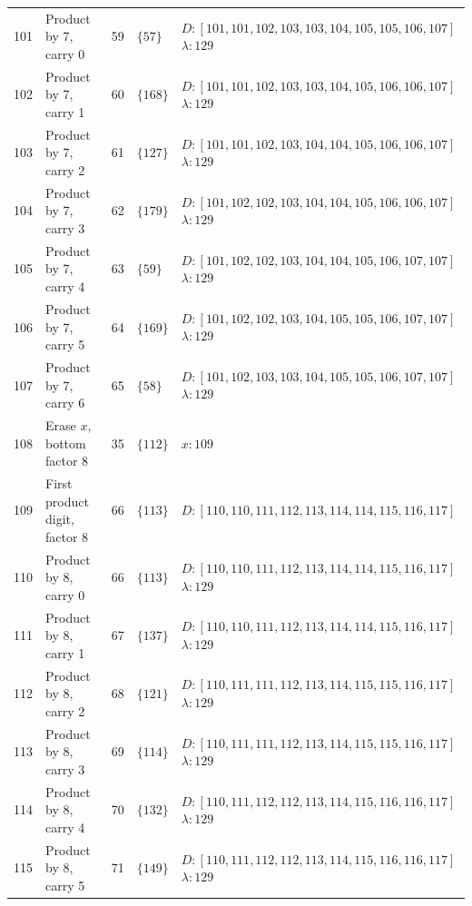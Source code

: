 \documentclass[11pt,a4paper]{article}
\newcommand{\blank}{\lambda}
\begin{document}
\begin{longtable}{r p{4.0cm} r l p{8.1cm}}
101 & Product by 7, carry 0 & 59 & $\{57\}$ & $D:[101,101,102,103,103,104,105,105,106,107]$\newline$\blank:129$ \\
102 & Product by 7, carry 1 & 60 & $\{168\}$ & $D:[101,101,102,103,103,104,105,106,106,107]$\newline$\blank:129$ \\
103 & Product by 7, carry 2 & 61 & $\{127\}$ & $D:[101,101,102,103,104,104,105,106,106,107]$\newline$\blank:129$ \\
104 & Product by 7, carry 3 & 62 & $\{179\}$ & $D:[101,102,102,103,104,104,105,106,106,107]$\newline$\blank:129$ \\
105 & Product by 7, carry 4 & 63 & $\{59\}$ & $D:[101,102,102,103,104,104,105,106,107,107]$\newline$\blank:129$ \\
106 & Product by 7, carry 5 & 64 & $\{169\}$ & $D:[101,102,102,103,104,105,105,106,107,107]$\newline$\blank:129$ \\
107 & Product by 7, carry 6 & 65 & $\{58\}$ & $D:[101,102,103,103,104,105,105,106,107,107]$\newline$\blank:129$ \\
108 & Erase $x$, bottom factor 8 & 35 & $\{112\}$ & $x:109$ \\
109 & First product digit, factor 8 & 66 & $\{113\}$ & $D:[110,110,111,112,113,114,114,115,116,117]$ \\
110 & Product by 8, carry 0 & 66 & $\{113\}$ & $D:[110,110,111,112,113,114,114,115,116,117]$\newline$\blank:129$ \\
111 & Product by 8, carry 1 & 67 & $\{137\}$ & $D:[110,110,111,112,113,114,114,115,116,117]$\newline$\blank:129$ \\
112 & Product by 8, carry 2 & 68 & $\{121\}$ & $D:[110,111,111,112,113,114,115,115,116,117]$\newline$\blank:129$ \\
113 & Product by 8, carry 3 & 69 & $\{114\}$ & $D:[110,111,111,112,113,114,115,115,116,117]$\newline$\blank:129$ \\
114 & Product by 8, carry 4 & 70 & $\{132\}$ & $D:[110,111,112,112,113,114,115,116,116,117]$\newline$\blank:129$ \\
115 & Product by 8, carry 5 & 71 & $\{149\}$ & $D:[110,111,112,112,113,114,115,116,116,117]$\newline$\blank:129$ \\

\end{longtable}
\end{document}
